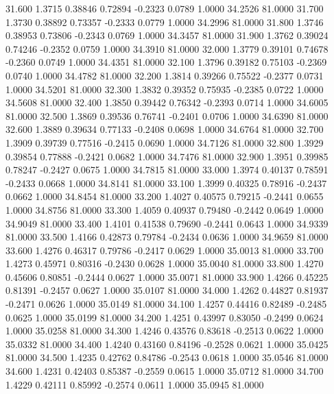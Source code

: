  31.600   1.3715   0.38846   0.72894  -0.2323   0.0789   1.0000  34.2526  81.0000
  31.700   1.3730   0.38892   0.73357  -0.2333   0.0779   1.0000  34.2996  81.0000
  31.800   1.3746   0.38953   0.73806  -0.2343   0.0769   1.0000  34.3457  81.0000
  31.900   1.3762   0.39024   0.74246  -0.2352   0.0759   1.0000  34.3910  81.0000
  32.000   1.3779   0.39101   0.74678  -0.2360   0.0749   1.0000  34.4351  81.0000
  32.100   1.3796   0.39182   0.75103  -0.2369   0.0740   1.0000  34.4782  81.0000
  32.200   1.3814   0.39266   0.75522  -0.2377   0.0731   1.0000  34.5201  81.0000
  32.300   1.3832   0.39352   0.75935  -0.2385   0.0722   1.0000  34.5608  81.0000
  32.400   1.3850   0.39442   0.76342  -0.2393   0.0714   1.0000  34.6005  81.0000
  32.500   1.3869   0.39536   0.76741  -0.2401   0.0706   1.0000  34.6390  81.0000
  32.600   1.3889   0.39634   0.77133  -0.2408   0.0698   1.0000  34.6764  81.0000
  32.700   1.3909   0.39739   0.77516  -0.2415   0.0690   1.0000  34.7126  81.0000
  32.800   1.3929   0.39854   0.77888  -0.2421   0.0682   1.0000  34.7476  81.0000
  32.900   1.3951   0.39985   0.78247  -0.2427   0.0675   1.0000  34.7815  81.0000
  33.000   1.3974   0.40137   0.78591  -0.2433   0.0668   1.0000  34.8141  81.0000
  33.100   1.3999   0.40325   0.78916  -0.2437   0.0662   1.0000  34.8454  81.0000
  33.200   1.4027   0.40575   0.79215  -0.2441   0.0655   1.0000  34.8756  81.0000
  33.300   1.4059   0.40937   0.79480  -0.2442   0.0649   1.0000  34.9049  81.0000
  33.400   1.4101   0.41538   0.79690  -0.2441   0.0643   1.0000  34.9339  81.0000
  33.500   1.4166   0.42873   0.79784  -0.2434   0.0636   1.0000  34.9659  81.0000
  33.600   1.4276   0.46317   0.79786  -0.2417   0.0629   1.0000  35.0013  81.0000
  33.700   1.4273   0.45971   0.80316  -0.2430   0.0628   1.0000  35.0040  81.0000
  33.800   1.4270   0.45606   0.80851  -0.2444   0.0627   1.0000  35.0071  81.0000
  33.900   1.4266   0.45225   0.81391  -0.2457   0.0627   1.0000  35.0107  81.0000
  34.000   1.4262   0.44827   0.81937  -0.2471   0.0626   1.0000  35.0149  81.0000
  34.100   1.4257   0.44416   0.82489  -0.2485   0.0625   1.0000  35.0199  81.0000
  34.200   1.4251   0.43997   0.83050  -0.2499   0.0624   1.0000  35.0258  81.0000
  34.300   1.4246   0.43576   0.83618  -0.2513   0.0622   1.0000  35.0332  81.0000
  34.400   1.4240   0.43160   0.84196  -0.2528   0.0621   1.0000  35.0425  81.0000
  34.500   1.4235   0.42762   0.84786  -0.2543   0.0618   1.0000  35.0546  81.0000
  34.600   1.4231   0.42403   0.85387  -0.2559   0.0615   1.0000  35.0712  81.0000
  34.700   1.4229   0.42111   0.85992  -0.2574   0.0611   1.0000  35.0945  81.0000
